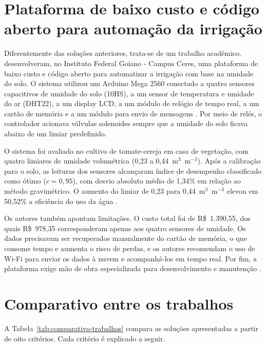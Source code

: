 \section{Plataforma de baixo custo e código aberto para automação da irrigação}
\label{sec:campos}

Diferentemente das soluções anteriores, trata-se de um trabalho acadêmico.
 desenvolveram, no Instituto Federal Goiano - Campus Ceres, uma
plataforma de baixo custo e código aberto para automatizar a irrigação com base
na umidade do solo. O sistema utilizou um Arduino Mega 2560 conectado a quatro
sensores capacitivos de umidade do solo (10HS), a um sensor de temperatura e
umidade do ar (DHT22), a um display LCD, a um módulo de relógio de
tempo real, a um cartão de memória e a um módulo  para envio de mensagens
. Por meio de relés, o controlador acionava válvulas solenoides sempre que a
umidade do solo ficava abaixo de um limiar predefinido.

O sistema foi avaliado no cultivo de tomate-cereja em casa de vegetação, com
quatro limiares de umidade volumétrica (0,23 a 0,44~m$^3$~m$^{-3}$). Após a
calibração para o solo, as leituras dos sensores alcançaram índice de desempenho
classificado como ótimo ($c = 0{,}95$), com desvio absoluto médio de 1,34\% em
relação ao método gravimétrico. O aumento do limiar de 0,23 para
0,44~m$^3$~m$^{-3}$ elevou em 50,52\% a eficiência do uso da água
\cite{campos2021}.

Os autores também apontam limitações. O custo total foi de R\$~1.390,55, dos
quais R\$~978,35 corresponderam apenas aos quatro sensores de umidade. Os dados
precisavam ser recuperados manualmente do cartão de memória, o que consome tempo
e aumenta o risco de perdas, e os autores recomendam o uso de Wi-Fi para enviar
os dados à nuvem e acompanhá-los em tempo real. Por fim, a plataforma exige mão
de obra especializada para desenvolvimento e manutenção \cite{campos2021}.

\section{Comparativo entre os trabalhos}
\label{sec:comparativo-trabalhos}

A Tabela~\ref{tab:comparativo-trabalhos} compara as soluções apresentadas a
partir de oito critérios. Cada critério é explicado a seguir.

